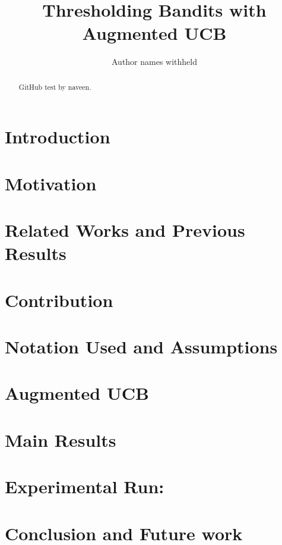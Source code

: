 \documentclass{article}
\title{Thresholding Bandits with Augmented UCB}
\author{Author names withheld}
\begin{document}
\maketitle

\begin{abstract}
GitHub test by naveen.
\end{abstract}


\section{Introduction}
\label{intro}


\section{Motivation}
\label{motivation}


\section{Related Works and Previous Results}
\label{prevRes}


\section{Contribution}
\label{contribution}


\section{Notation Used and Assumptions}
\label{notation}



\section{Augmented UCB}
\label{algo}


\section{Main Results}
\label{results}



\section{Experimental Run:}
\label{expt}



\section{Conclusion and Future work}
\label{conclusion}






%
\end{document}
